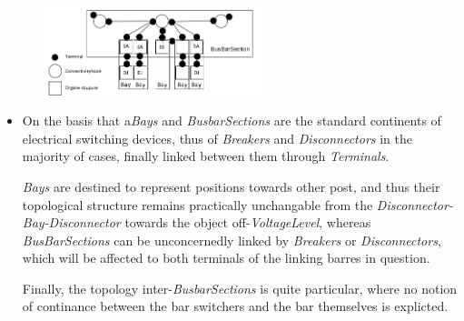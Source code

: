     \begin{figure}[h]
    \centering
    \parbox[t]{0.6\textwidth}{
    {\centering
    \includegraphics[width=0.6\textwidth]{0.figuras/Terminal_connectivityNode.png}}
    \label{fig:Terminal-ConnectivityNode}}
\end{figure}

\begin{itemize}[label={}]
        \begin{itemize}
\item On the basis that a\textit{Bays} and \textit{BusbarSections} are the standard continents of electrical switching devices, thus of \textit{Breakers} and \textit{Disconnectors} in the majority of cases, finally linked between them through \textit{Terminals}. 

\textit{Bays} are destined to represent positions towards other post, and thus their topological structure remains practically unchangable from the \textit{Disconnector-Bay-Disconnector} towards the object off-\textit{VoltageLevel}, whereas \textit{BusBarSections} can be unconcernedly linked by \textit{Breakers} or \textit{Disconnectors}, which will be affected to both terminals of the linking barres in question.

Finally, the topology inter-\textit{BusbarSections} is quite particular, where no notion of continance between the bar switchers and the bar themselves is explicted. 

\end{itemize}


\end{itemize}

